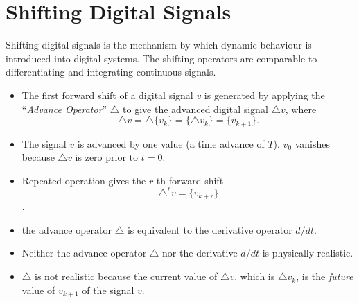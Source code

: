 \ifslidesonly
\begin{slide}

\end{slide}
\fi


\section*{Shifting Digital Signals}
Shifting digital signals is the mechanism by which dynamic
behaviour is introduced into digital systems. The shifting
operators are comparable to differentiating and integrating
continuous signals.

\begin{slide}
  \label{slide:l7s4}
\begin{itemize}

\item   The first forward shift of a digital signal $v$ is generated by
  applying the ``\emph{Advance Operator}'' $\triangle$  to give the
  advanced digital signal $\triangle v$, where \[ \triangle v = \triangle
  \{v_k\} = \{\triangle v_k\} = \{v_{k+1}\}.\]
  

\item   The signal $v$ is advanced by one value (a time advance of
  $T$). $v_0$ vanishes because $\triangle v$ is zero prior to $t=0$.


\item   Repeated operation gives the $r$-th forward shift \[
  \triangle^r v = \{v_{k+r}\}\].

\end{itemize}

\end{slide}

\begin{slide}
\label{slide:l7s4a}

\begin{itemize}

\item the advance operator $\triangle$ is equivalent to the derivative operator
  $d/dt$.

\item   Neither the advance operator $\triangle$ nor the derivative
  $d/dt$ is physically realistic. 

\item $\triangle$ is not realistic because
  the current value of $\triangle v$, which is $\triangle v_k$,
  is the \emph{future} value of $v_{k+1}$ of the signal $v$. 

\end{itemize}
\end{slide}

